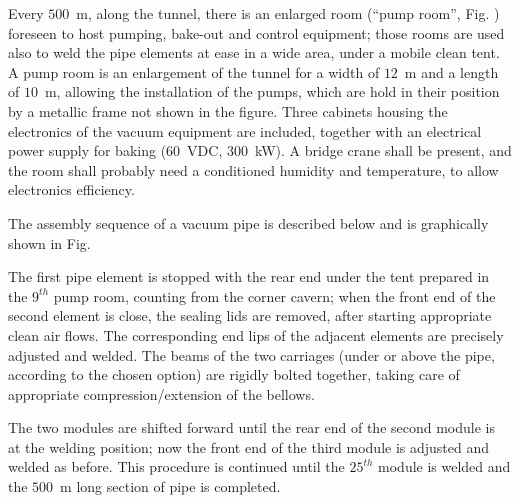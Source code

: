 Every $500$~m, along the tunnel, there is an enlarged room (``pump room'', Fig.%
) foreseen to host pumping, bake-out and control equipment; those rooms are used also to weld the pipe elements at ease in a wide area, under a mobile clean tent. A pump room is an enlargement of the tunnel for a width of $12$~m and a length of $10$~m, allowing the installation of the pumps, which are hold in their position by a metallic frame not shown in the figure. Three cabinets housing the electronics of the vacuum equipment are included, together with an electrical power supply for baking ($60$~VDC, $300$~kW). A bridge crane shall be present, and the room shall probably need a conditioned humidity and temperature, to allow electronics efficiency. 

The assembly sequence of a vacuum pipe is described below and is graphically shown in Fig. %

The first pipe element is stopped with the rear end under the tent prepared in the $9^{th}$ pump room, counting from the corner cavern; when the front end of the second element is close, the sealing lids are removed, after starting appropriate clean air flows. The corresponding end lips of the adjacent elements are precisely adjusted and welded. The beams of the two carriages (under or above the pipe, according to the chosen option) are rigidly bolted together, taking care of appropriate compression/extension of the bellows. 

The two modules are shifted forward until the rear end of the second module is at the welding position; now the front end of the third module is adjusted and welded as before. This procedure is continued until the $25^{th}$ module is welded and the $500$~m long section of pipe is completed. 

